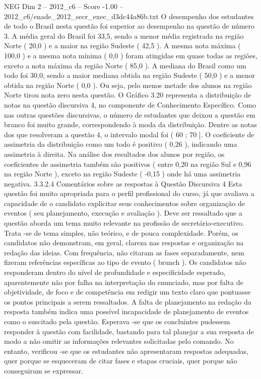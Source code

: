 \begin{textsample}{NEG Dim 2 – 2012\_c6 – Score -1.00 – 2012\_c6/enade\_2012\_secr\_exec\_d3dc44a86b.txt}
O desempenho dos estudantes de todo o Brasil nesta questão foi superior ao desempenho na questão de número 3.
A média geral do Brasil foi 33,5, sendo a menor média registrada na região Norte ( 20,0 ) e a maior na região Sudeste ( 42,5 ).
A mesma nota máxima ( 100,0 ) e a mesma nota mínima ( 0,0 ) foram atingidas em quase todas as regiões, exceto a nota máxima da região Norte ( 85,0 ).
A mediana do Brasil como um todo foi 30,0, sendo a maior mediana obtida na região Sudeste ( 50,0 ) e a menor obtida na região Norte ( 0,0 ).
Ou seja, pelo menos metade dos alunos na região Norte tirou nota zero nesta questão.
O Gráfico 3.20 representa a distribuição de notas na questão discursiva 4, no componente de Conhecimento Específico.
Como nas outras questões discursivas, o número de estudantes que deixou a questão em branco foi muito grande, correspondendo à moda da distribuição.
Dentre as notas dos que resolveram a questão 4, o intervalo modal foi ( 60 ; 70 ].
O coeficiente de assimetria da distribuição como um todo é positivo ( 0,26 ), indicando uma assimetria à direita.
Na análise dos resultados dos alunos por região, os coeficientes de assimetria também são positivos ( entre 0,20 na região Sul e 0,96 na região Norte ), exceto na região Sudeste ( -0,15 ) onde há uma assimetria negativa. 3.3.2.4 Comentários sobre as respostas à Questão Discursiva 4 Esta questão foi muito apropriada para o perfil profissional do curso, já que avaliava a capacidade de o candidato explicitar seus conhecimentos sobre organização de eventos ( seu planejamento, execução e avaliação ).
Deve ser ressaltado que a questão aborda um tema muito relevante na profissão de secretário-executivo.
Trata -se de tema simples, não teórico, e de pouca complexidade.
Porém, os candidatos não demonstram, em geral, clareza nas respostas e organização na redação das ideias.
Com frequência, não citaram as fases separadamente, nem fizeram referências específicas ao tipo de evento ( brunch ).
Os candidatos não responderam dentro do nível de profundidade e especificidade esperado, aparentemente não por falha na interpretação do enunciado, mas por falta de objetividade, de foco e de competência em redigir um texto claro que pontuasse os pontos principais a serem ressaltados.
A falta de planejamento na redação da resposta também indica uma possível incapacidade de planejamento de eventos como o suscitado pela questão.
Esperava -se que os concluintes pudessem responder à questão com facilidade, bastando para tal planejar a sua resposta de modo a não omitir as informações relevantes solicitadas pelo comando.
No entanto, verificou -se que os estudantes não apresentaram respostas adequadas, quer porque se esqueceram de citar fases e etapas cruciais, quer porque não conseguiram se expressar.

\end{textsample}
